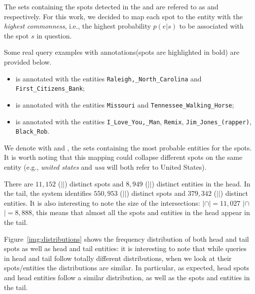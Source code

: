 The sets containing the spots detected in the 
\head{} and \tail{} are refered to as \shead{} and \stail{} respectively. 
For this work, we decided to map each spot to the entity with the \emph{highest commonness}, 
i.e., the highest probability $p(e|s)$ to be associated with the spot $s$ in question.

Some real query examples with annotations(spots are highlighted in bold) are provided below.
\begin{itemize}
\item {} is annotated with the entities 
\texttt{Raleigh,\_North\_Carolina} and \\ \texttt{First\_Citizens\_Bank};
\item {} is annotated with the entities  \texttt{Missouri} and  \texttt{Tennessee\_Walking\_Horse};
\item {} is annotated with the entities  \texttt{I\_Love\_You,\_Man}, \texttt{Remix}, \texttt{Jim\_Jones\_(rapper)}, \texttt{Black\_Rob}.
 \end{itemize}


We denote with \ehead{} and \etail{}, the sets containing the most probable entities for the spots. 
It is worth noting that this mapping could collapse different spots on the same entity (e.g., \emph{united states} and 
\emph{usa} will both refer to United States). 

There are $11,152$ ($|$\shead{}$|$)  distinct spots and $8,949$ ($|$\ehead{}$|$) distinct 
entities in the head. In the tail, the system identifies $550,953$ ($|$\stail{}$|$) distinct spots and 
$379,342$ ($|$\etail{}$|$) distinct entities. It  is also interesting to note the size of the 
intersections: \mbox{$|$\shead{}$\cap$\stail{}$|=11,027$}  $|$\ehead{}$\cap$\etail{}$| = 8,888$,
this means that almost all the spots and entities in the head appear in the tail. 

Figure~\ref{img:distributions} shows the frequency distribution of both head and tail spots as well as head and tail entities:
it is interesting to note that while queries in head and tail follow totally different distributions, when we look at their 
spots/entities the distributions are similar. In particular, as expected, head spots and head entities 
follow a similar distribution, as well as the spots and entities in the tail. 

